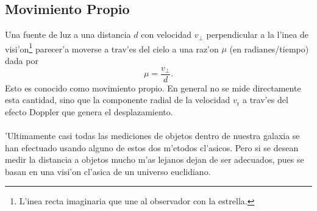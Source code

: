 \subsection{Movimiento Propio}
Una fuente de luz a una distancia $d$ con  velocidad $v_{\bot}$ perpendicular a la l'inea de visi'on\footnote{L'inea recta imaginaria que une al observador con la estrella.}
parecer'a moverse a trav'es del cielo a una raz'on $\mu$ (en radianes/tiempo) dada por
\begin{equation}
\mu=\frac{v_{\bot}}{d}.
\end{equation}
Esto es conocido como movimiento propio. En general no se mide directamente esta cantidad, sino que la componente radial de la velocidad
$v_{\mbox{r}}$ a trav'es del efecto Doppler que genera el desplazamiento.\\ \\
'Ultimamente casi todas las mediciones de objetos dentro de nuestra galaxia se han efectuado usando alguno de estos dos m'etodos cl'asicos. Pero
si se desean medir la distancia a objetos mucho m'as lejanos dejan de ser adecuados, pues se basan en una visi'on cl'asica de un universo euclidiano.

